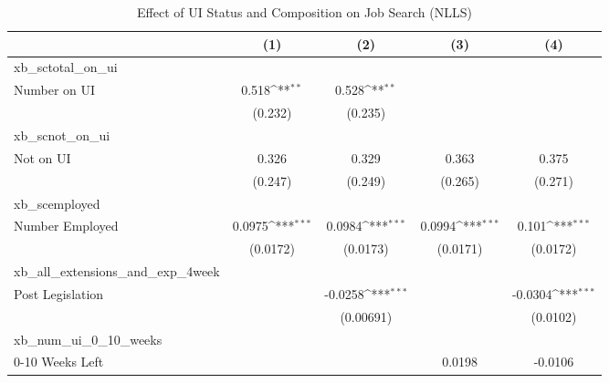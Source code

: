 \begin{table}[htbp]\centering
\def\sym#1{\ifmmode^{#1}\else\(^{#1}\)\fi}
\caption{Effect of UI Status and Composition on Job Search (NLLS) \label{tab:nlls}}
\begin{tabular}{l*{4}{c}}
\hline\hline
                    &\multicolumn{1}{c}{(1)}         &\multicolumn{1}{c}{(2)}         &\multicolumn{1}{c}{(3)}         &\multicolumn{1}{c}{(4)}         \\
\hline
xb\_sctotal\_on\_ui    &                     &                     &                     &                     \\
Number on UI        &       0.518\sym{**} &       0.528\sym{**} &                     &                     \\
                    &     (0.232)         &     (0.235)         &                     &                     \\
\hline
xb\_scnot\_on\_ui      &                     &                     &                     &                     \\
Not on UI           &       0.326         &       0.329         &       0.363         &       0.375         \\
                    &     (0.247)         &     (0.249)         &     (0.265)         &     (0.271)         \\
\hline
xb\_scemployed       &                     &                     &                     &                     \\
Number Employed     &      0.0975\sym{***}&      0.0984\sym{***}&      0.0994\sym{***}&       0.101\sym{***}\\
                    &    (0.0172)         &    (0.0173)         &    (0.0171)         &    (0.0172)         \\
\hline
xb\_all\_extensions\_and\_exp\_4week&                     &                     &                     &                     \\
Post Legislation    &                     &     -0.0258\sym{***}&                     &     -0.0304\sym{***}\\
                    &                     &   (0.00691)         &                     &    (0.0102)         \\
\hline
xb\_num\_ui\_0\_10\_weeks&                     &                     &                     &                     \\
0-10 Weeks Left     &                     &                     &      0.0198         &     -0.0106         \\

\end{tabular}
\end{table}
